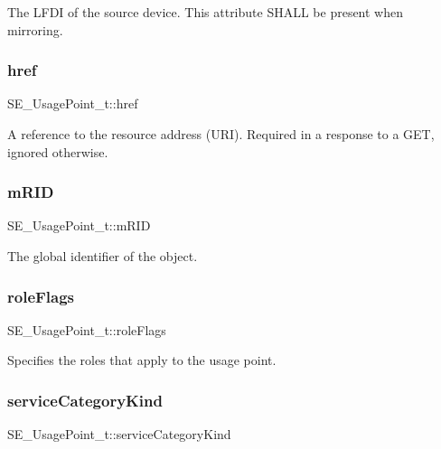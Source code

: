 The L\+F\+DI of the source device. This attribute S\+H\+A\+LL be present when mirroring. \mbox{\label{group__UsagePoint_ga43021172f7da501245b4e72b80ee5e75}} 
\subsubsection{\texorpdfstring{href}{href}}
{\footnotesize\ttfamily S\+E\+\_\+\+Usage\+Point\+\_\+t\+::href}

A reference to the resource address (U\+RI). Required in a response to a G\+ET, ignored otherwise. \mbox{\label{group__UsagePoint_ga645e59a2bd1f4d5685d14e5df4176b16}} 
\subsubsection{\texorpdfstring{m\+R\+ID}{mRID}}
{\footnotesize\ttfamily S\+E\+\_\+\+Usage\+Point\+\_\+t\+::m\+R\+ID}

The global identifier of the object. \mbox{\label{group__UsagePoint_gaa7a0bde02ead6c247119e2e009da01fd}} 
\subsubsection{\texorpdfstring{role\+Flags}{roleFlags}}
{\footnotesize\ttfamily S\+E\+\_\+\+Usage\+Point\+\_\+t\+::role\+Flags}

Specifies the roles that apply to the usage point. \mbox{\label{group__UsagePoint_ga5d3e64f099c6fee8452abdfa1fce6cb2}} 
\subsubsection{\texorpdfstring{service\+Category\+Kind}{serviceCategoryKind}}
{\footnotesize\ttfamily S\+E\+\_\+\+Usage\+Point\+\_\+t\+::service\+Category\+Kind}

